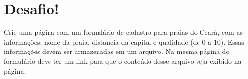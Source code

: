 \section{Desafio!}
\label{cap9-desafio}

Crie uma página com um formulário de cadastro para praias do Ceará, com as informações: nome da praia, 
distancia da capital e qualidade (de 0 a 10). Essas informações devem ser armazenadas em um arquivo. Na 
mesma página do formulário deve ter um link para que o conteúdo desse arquivo seja exibido na página.

